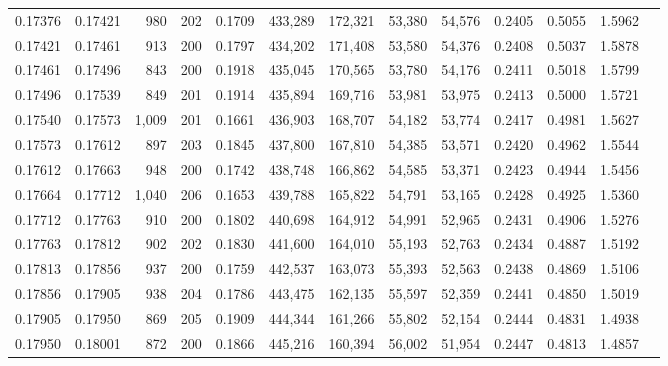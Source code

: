 \begin{tabular}{rrrrrrrrrrrrr}
0.17376 & 0.17421 &   980 & 202 &                                     0.1709 & 433,289 & 172,321 &  53,380 &  54,576 & 0.2405 & 0.5055 & 1.5962 \\
0.17421 & 0.17461 &   913 & 200 &                                     0.1797 & 434,202 & 171,408 &  53,580 &  54,376 & 0.2408 & 0.5037 & 1.5878 \\
0.17461 & 0.17496 &   843 & 200 &                                     0.1918 & 435,045 & 170,565 &  53,780 &  54,176 & 0.2411 & 0.5018 & 1.5799 \\
0.17496 & 0.17539 &   849 & 201 &                                     0.1914 & 435,894 & 169,716 &  53,981 &  53,975 & 0.2413 & 0.5000 & 1.5721 \\
0.17540 & 0.17573 & 1,009 & 201 &                                     0.1661 & 436,903 & 168,707 &  54,182 &  53,774 & 0.2417 & 0.4981 & 1.5627 \\
0.17573 & 0.17612 &   897 & 203 &                                     0.1845 & 437,800 & 167,810 &  54,385 &  53,571 & 0.2420 & 0.4962 & 1.5544 \\
0.17612 & 0.17663 &   948 & 200 &                                     0.1742 & 438,748 & 166,862 &  54,585 &  53,371 & 0.2423 & 0.4944 & 1.5456 \\
0.17664 & 0.17712 & 1,040 & 206 &                                     0.1653 & 439,788 & 165,822 &  54,791 &  53,165 & 0.2428 & 0.4925 & 1.5360 \\
0.17712 & 0.17763 &   910 & 200 &                                     0.1802 & 440,698 & 164,912 &  54,991 &  52,965 & 0.2431 & 0.4906 & 1.5276 \\
0.17763 & 0.17812 &   902 & 202 &                                     0.1830 & 441,600 & 164,010 &  55,193 &  52,763 & 0.2434 & 0.4887 & 1.5192 \\
0.17813 & 0.17856 &   937 & 200 &                                     0.1759 & 442,537 & 163,073 &  55,393 &  52,563 & 0.2438 & 0.4869 & 1.5106 \\
0.17856 & 0.17905 &   938 & 204 &                                     0.1786 & 443,475 & 162,135 &  55,597 &  52,359 & 0.2441 & 0.4850 & 1.5019 \\
0.17905 & 0.17950 &   869 & 205 &                                     0.1909 & 444,344 & 161,266 &  55,802 &  52,154 & 0.2444 & 0.4831 & 1.4938 \\
0.17950 & 0.18001 &   872 & 200 &                                     0.1866 & 445,216 & 160,394 &  56,002 &  51,954 & 0.2447 & 0.4813 & 1.4857 \\

\end{tabular}
